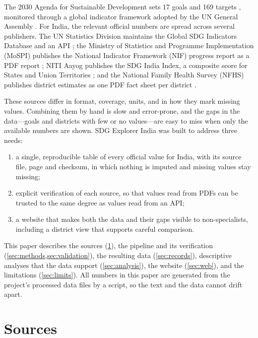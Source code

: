 \documentclass[11pt,a4paper]{article}
\begin{document}
The 2030 Agenda for Sustainable Development sets 17 goals and 169 targets \citep{un2015agenda}, monitored through a global indicator framework adopted by the UN General Assembly \citep{un2017framework}. For India, the relevant official numbers are spread across several publishers. The UN Statistics Division maintains the Global SDG Indicators Database and an API \citep{unsd_sdgdb}; the Ministry of Statistics and Programme Implementation (MoSPI) publishes the National Indicator Framework (NIF) progress report as a PDF report \citep{mospi2025nif}; NITI Aayog publishes the SDG India Index, a composite score for States and Union Territories \citep{niti2024sdgii}; and the National Family Health Survey (NFHS) publishes district estimates as one PDF fact sheet per district \citep{iips2021nfhs5,nfhs5_dfs}.

These sources differ in format, coverage, units, and in how they mark missing values. Combining them by hand is slow and error-prone, and the gaps in the data---goals and districts with few or no values---are easy to miss when only the available numbers are shown. SDG Explorer India \citep{sdgexplorer} was built to address three needs:
\begin{enumerate}[label=(\roman*)]
  \item a single, reproducible table of every official value for India, with its source file, page and checksum, in which nothing is imputed and missing values stay missing;
  \item explicit verification of each source, so that values read from PDFs can be trusted to the same degree as values read from an API;
  \item a website that makes both the data and their gaps visible to non-specialists, including a district view that supports careful comparison.
\end{enumerate}
This paper describes the sources (\cref{sec:sources}), the pipeline and its verification (\cref{sec:methods,sec:validation}), the resulting data (\cref{sec:records}), descriptive analyses that the data support (\cref{sec:analysis}), the website (\cref{sec:web}), and the limitations (\cref{sec:limits}). All numbers in this paper are generated from the project's processed data files by a script, so the text and the data cannot drift apart.

\section{Sources}\label{sec:sources}
\end{document}
